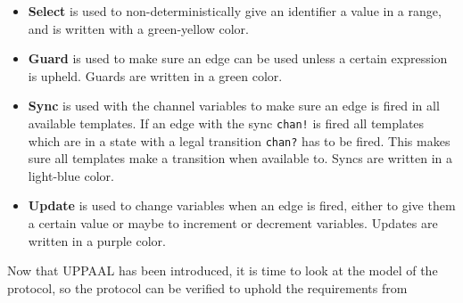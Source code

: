 \begin{itemize}
	\item \textbf{Select} is used to non-deterministically give an identifier a value in a range, and is written with a green-yellow color.
	\item \textbf{Guard} is used to make sure an edge can be used unless a certain expression is upheld. Guards are written in a green color.
	\item \textbf{Sync} is used with the channel variables to make sure an edge is fired in all available templates. If an edge with the sync \texttt{chan!} is fired all templates which are in a state with a legal transition \texttt{chan?} has to be fired. This makes sure all templates make a transition when available to. Syncs are written in a light-blue color.
	\item \textbf{Update} is used to change variables when an edge is fired, either to give them a certain value or maybe to increment or decrement variables. Updates are written in a purple color.
\end{itemize}

Now that UPPAAL has been introduced, it is time to look at the model of the protocol, so the protocol can be verified to uphold the requirements from 
